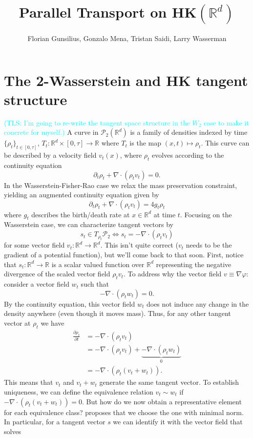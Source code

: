 \documentclass{article}
\title{Parallel Transport on HK$(\mathbb{R}^d)$}
\author{Florian Gunsilius, Gonzalo Mena, Tristan Saidi, Larry Wasserman}
\begin{document}
\maketitle


\section{The 2-Wasserstein and HK tangent structure}
\textcolor{cyan}{(TLS: I'm going to re-write the tangent space structure in the $W_2$ case to make it concrete for myself.)} A curve in $\mathcal{P}_2(\mathbb{R}^d)$ is a family of densities indexed by time $\{\rho_t\}_{t\in [0,\tau]}$, $T_t: \mathbb{R}^d \times [0, \tau] \rightarrow \mathbb{R}$ where $T_t$ is the map $(x,t) \mapsto \rho_t$. This curve can be described by a velocity field $v_t(x)$, where $\rho_t$ evolves according to the continuity equation
\[\partial_t \rho_t  + \nabla \cdot (\rho_tv_t) = 0.\]
In the Wasserstein-Fisher-Rao case we relax the mass preservation constraint, yielding an augmented continuity equation given by
\[\partial_t \rho_t  + \nabla \cdot (\rho_tv_t) = 4g_t\rho_t\]
where $g_t$ describes the birth/death rate at $x \in \mathbb{R}^d$ at time $t$. Focusing on the Wasserstein case, we can characterize tangent vectors by
\[s_t \in T_{\rho_t} \mathcal{P}_2 \iff s_t = -\nabla \cdot (\rho_t v_t)\]
for some vector field $v_t: \mathbb{R}^d \rightarrow \mathbb{R}^d$. This isn't quite correct ($v_t$ needs to be the gradient of a potential function), but we'll come back to that soon. First, notice that $s_t: \mathbb{R}^d \rightarrow \mathbb{R}$ is a scalar valued function over $\mathbb{R}^d$ representing the negative divergence of the scaled vector field $\rho_tv_t$. To address why the vector field $v \equiv \nabla\varphi$: consider a vector field $w_t$ such that 
\[-\nabla \cdot (\rho_t w_t) = 0.\]
By the continuity equation, this vector field $w_t$ does not induce any change in the density anywhere (even though it moves mass). Thus, for any other tangent vector at $\rho_t$ we have 
\begin{align}
    \frac{\partial\rho_t}{\partial t} &= -\nabla \cdot (\rho_tv_t)\\  
    &= -\nabla \cdot (\rho_tv_t) + \underbrace{-\nabla \cdot(\rho_tw_t)}_{0} \\
    &= -\nabla \cdot (\rho_t(v_t +w_t)).
\end{align}
This means that $v_t$ and $v_t + w_t$ generate the same tangent vector. To establish uniqueness, we can define the equivalence relation $v_t \sim w_t$ if $-\nabla \cdot (\rho_t(v_t + w_t)) = 0$. But how do we now obtain a representative element for each equivalence class? \citet{otto2001geometry} proposes that we choose the one with minimal norm. In particular, for a tangent vector $s$ we can identify it with the vector field that solves
\end{document}
